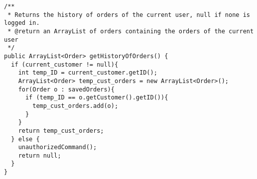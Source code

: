 \begin{lstlisting}[caption=Application of the \texttt{current\_customer}
  concept to \texttt{getHistoryOfOrders}.,
  label=lst:historyOfOrders]
/**
 * Returns the history of orders of the current user, null if none is logged in.
 * @return an ArrayList of orders containing the orders of the current user
 */
public ArrayList<Order> getHistoryOfOrders() {
  if (current_customer != null){
    int temp_ID = current_customer.getID();
    ArrayList<Order> temp_cust_orders = new ArrayList<Order>();
    for(Order o : savedOrders){
      if (temp_ID == o.getCustomer().getID()){
        temp_cust_orders.add(o);
      }
    }
    return temp_cust_orders;
  } else {
    unauthorizedCommand();
    return null;
  }
}
\end{lstlisting}


\lstset{basicstyle=\rm\small\ttfamily}
